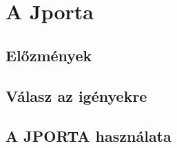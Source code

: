 \chapter{A Jporta}\label{chapter:jporta}

\section{Előzmények}

\section{Válasz az igényekre}

\section{A JPORTA használata}
